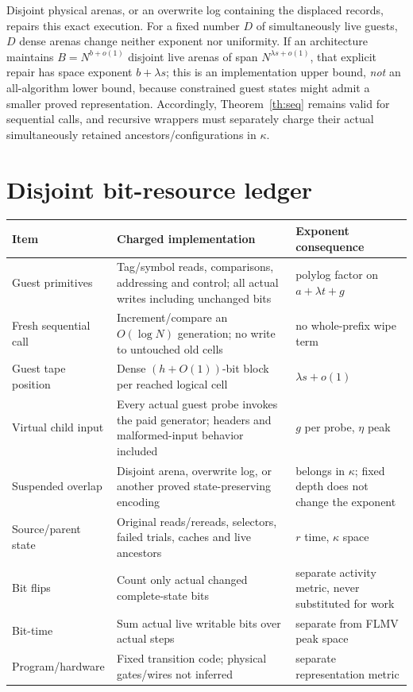 \documentclass[11pt]{article}
\begin{document}
Disjoint physical arenas, or an overwrite log containing the displaced
records, repairs this exact execution.  For a fixed number $D$ of
simultaneously live guests, $D$ dense arenas change neither exponent nor
uniformity.  If an architecture maintains $B=N^{b+o(1)}$ disjoint live arenas
of span $N^{\lambda s+o(1)}$, that explicit repair has space exponent
$b+\lambda s$; this is an implementation upper bound, \emph{not} an
all-algorithm lower bound, because constrained guest states might admit a
smaller proved representation.  Accordingly, Theorem~\ref{th:seq} remains
valid for sequential calls, and recursive wrappers must separately charge
their actual simultaneously retained ancestors/configurations in $\kappa$.

\section{Disjoint bit-resource ledger}
\begin{center}
\begin{tabularx}{\linewidth}{@{}lXl@{}}
\toprule
Item & Charged implementation & Exponent consequence\\
\midrule
Guest primitives & Tag/symbol reads, comparisons, addressing and control;
all actual writes including unchanged bits & polylog factor on
$a+\lambda t+g$\\
Fresh sequential call & Increment/compare an $O(\log N)$ generation; no
write to untouched old cells & no whole-prefix wipe term\\
Guest tape position & Dense $(h+O(1))$-bit block per reached logical cell &
$\lambda s+o(1)$\\
Virtual child input & Every actual guest probe invokes the paid generator;
headers and malformed-input behavior included & $g$ per probe, $\eta$ peak\\
Suspended overlap & Disjoint arena, overwrite log, or another proved
state-preserving encoding & belongs in $\kappa$; fixed depth does not change
the exponent\\
Source/parent state & Original reads/rereads, selectors, failed trials,
caches and live ancestors & $r$ time, $\kappa$ space\\
Bit flips & Count only actual changed complete-state bits & separate activity
metric, never substituted for work\\
Bit-time & Sum actual live writable bits over actual steps & separate from
FLMV peak space\\
Program/hardware & Fixed transition code; physical gates/wires not inferred &
separate representation metric\\
\bottomrule
\end{tabularx}
\end{center}
\end{document}
